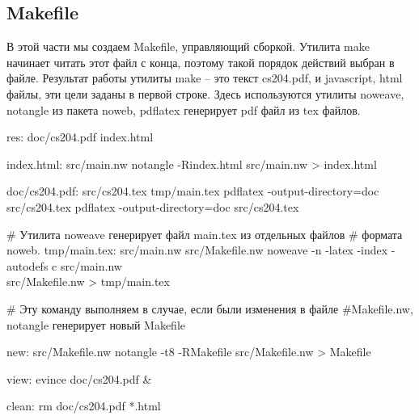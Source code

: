 \nwenddocs{}\subsection{Makefile}

В этой части
мы создаем Makefile, управляющий сборкой. 
Утилита make начинает читать этот файл с конца, поэтому
такой порядок действий выбран в файле.
Результат работы утилиты make -- это текст   cs204.pdf,
и javascript, html файлы,  эти цели заданы в первой строке.
Здесь используются утилиты noweave, notangle из пакета noweb,
 pdflatex генерирует pdf файл из tex файлов. 

\nwenddocs{}\endmoddef\nwstartdeflinemarkup\nwenddeflinemarkup
res: doc/cs204.pdf  index.html 


index.html: src/main.nw 
        notangle -Rindex.html src/main.nw > index.html 




doc/cs204.pdf: src/cs204.tex  tmp/main.tex
        pdflatex -output-directory=doc src/cs204.tex
        pdflatex -output-directory=doc src/cs204.tex

# Утилита noweave генерирует файл main.tex из отдельных файлов 
# формата noweb.
tmp/main.tex: src/main.nw  src/Makefile.nw
        noweave -n -latex -index -autodefs c  src/main.nw \\
                src/Makefile.nw > tmp/main.tex

# Эту команду выполняем в случае, если были изменения в файле 
#Makefile.nw, notangle генерирует новый Makefile

new: src/Makefile.nw
        notangle -t8 -RMakefile src/Makefile.nw > Makefile


view:
        evince doc/cs204.pdf &
        
clean:
        rm doc/cs204.pdf *.html  

\nwendcode{}\nwdocspar
\nwenddocs{}

%
%
%
%

